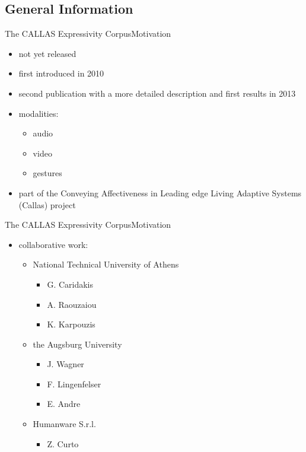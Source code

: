 \documentclass{beamer}
\begin{document}
		\subsection{General Information}
			\begin{frame}{The CALLAS Expressivity Corpus}{Motivation}			
				\begin{itemize}
					\item not yet released
					\item first introduced in 2010 \cite{2010MultimodalCorpusForGestureExpressivity}
					\item second publication with a more detailed description and first results in 2013 \cite{Caridakis2013}
					\item modalities:
					\begin{itemize}
						\item audio
						\item video
						\item gestures
					\end{itemize}
					\item part of the Conveying Affectiveness in Leading edge Living Adaptive
Systems (Callas) project
				\end{itemize}											
			\end{frame}		
			\begin{frame}{The CALLAS Expressivity Corpus}{Motivation}			
				\begin{itemize}
					\item collaborative work:
					\begin{itemize}
						\item National Technical University of Athens
							\begin{itemize}
								\item G. Caridakis
								\item A. Raouzaiou
								\item K. Karpouzis
							\end{itemize}
						\item the Augsburg University
							\begin{itemize}
								\item J. Wagner
								\item F. Lingenfelser
								\item E. Andre
							\end{itemize}
						\item Humanware S.r.l.
							\begin{itemize}
								\item Z. Curto
							\end{itemize}
					\end{itemize}
				\end{itemize}											
			\end{frame}		
			
\end{document}
